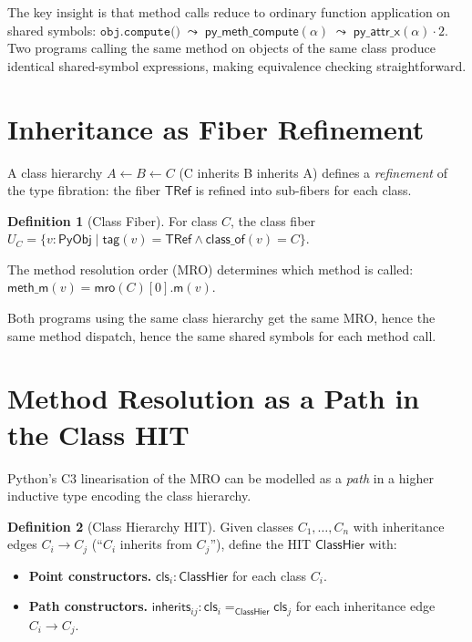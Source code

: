 \documentclass[11pt,a4paper]{report}
\theoremstyle{definition}
\newtheorem{definition}{Definition}[chapter]
\theoremstyle{plain}
\newcommand{\PyObj}{\mathsf{PyObj}}
\begin{document}
The key insight is that method calls reduce to ordinary function
application on shared symbols:
$\texttt{obj.compute()} \;\leadsto\; \mathsf{py\_meth\_compute}(\alpha)
  \;\leadsto\; \mathsf{py\_attr\_x}(\alpha) \cdot 2$.
Two programs calling the same method on objects of the same class
produce identical shared-symbol expressions, making equivalence
checking straightforward.

\section{Inheritance as Fiber Refinement}

A class hierarchy $A \leftarrow B \leftarrow C$ (C inherits B
inherits A) defines a \emph{refinement} of the type fibration:
the fiber $\mathsf{TRef}$ is refined into sub-fibers for each class.

\begin{definition}[Class Fiber]
For class $C$, the class fiber $U_C = \{v : \PyObj \mid
\mathsf{tag}(v) = \mathsf{TRef} \land \mathsf{class\_of}(v) = C\}$.

The method resolution order (MRO) determines which method is called:
$\mathsf{meth\_m}(v) = \mathsf{mro}(C)[0].\mathsf{m}(v)$.
\end{definition}

Both programs using the same class hierarchy get the same MRO,
hence the same method dispatch, hence the same shared symbols for
each method call.

\section{Method Resolution as a Path in the Class HIT}

Python's C3 linearisation of the MRO can be modelled as a
\emph{path} in a higher inductive type encoding the class hierarchy.

\begin{definition}[Class Hierarchy HIT]
Given classes $C_1, \ldots, C_n$ with inheritance edges
$C_i \to C_j$ (``$C_i$ inherits from $C_j$''), define the HIT
$\mathsf{ClassHier}$ with:
\begin{itemize}
  \item \textbf{Point constructors.}
    $\mathsf{cls}_i : \mathsf{ClassHier}$ for each class $C_i$.
  \item \textbf{Path constructors.}
    $\mathsf{inherits}_{ij} : \mathsf{cls}_i =_{\mathsf{ClassHier}} \mathsf{cls}_j$
    for each inheritance edge $C_i \to C_j$.
\end{itemize}
\end{definition}
\end{document}
